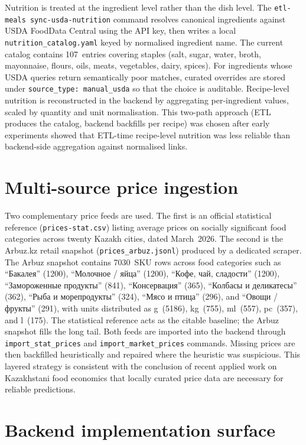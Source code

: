 Nutrition is treated at the ingredient level rather than the dish level. The \texttt{etl-meals sync-usda-nutrition} command resolves canonical ingredients against USDA FoodData Central using the API key, then writes a local \texttt{nutrition\_catalog.yaml} keyed by normalised ingredient name. The current catalog contains 107~entries covering staples (salt, sugar, water, broth, mayonnaise, flours, oils, meats, vegetables, dairy, spices). For ingredients whose USDA queries return semantically poor matches, curated overrides are stored under \texttt{source\_type: manual\_usda} so that the choice is auditable. Recipe-level nutrition is reconstructed in the backend by aggregating per-ingredient values, scaled by quantity and unit normalisation. This two-path approach (ETL produces the catalog, backend backfills per recipe) was chosen after early experiments showed that ETL-time recipe-level nutrition was less reliable than backend-side aggregation against normalised links.

\section{Multi-source price ingestion}

Two complementary price feeds are used. The first is an official statistical reference (\texttt{prices-stat.csv}) listing average prices on socially significant food categories across twenty Kazakh cities, dated March~2026. The second is the Arbuz.kz retail snapshot (\texttt{prices\_arbuz.jsonl}) produced by a dedicated scraper. The Arbuz snapshot contains 7030~SKU rows across food categories such as ``Бакалея'' (1200), ``Молочное / яйца'' (1200), ``Кофе, чай, сладости'' (1200), ``Замороженные продукты'' (841), ``Консервация'' (365), ``Колбасы и деликатесы'' (362), ``Рыба и морепродукты'' (324), ``Мясо и птица'' (296), and ``Овощи / фрукты'' (291), with units distributed as g~(5186), kg~(755), ml~(557), pc~(357), and l~(175). The statistical reference acts as the citable baseline; the Arbuz snapshot fills the long tail. Both feeds are imported into the backend through \texttt{import\_stat\_prices} and \texttt{import\_market\_prices} commands. Missing prices are then backfilled heuristically and repaired where the heuristic was suspicious. This layered strategy is consistent with the conclusion of recent applied work on Kazakhstani food economics \cite{sapakova2023application} that locally curated price data are necessary for reliable predictions.

\section{Backend implementation surface}

